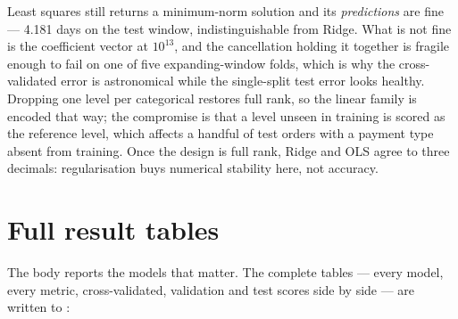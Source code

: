 Least squares still returns a minimum-norm solution and its \emph{predictions}
are fine --- 4.181 days on the test window, indistinguishable from Ridge. What is
not fine is the coefficient vector at $10^{13}$, and the cancellation holding it
together is fragile enough to fail on one of five expanding-window folds, which
is why the cross-validated error is astronomical while the single-split test
error looks healthy. Dropping one level per categorical restores full rank, so
the linear family is encoded that way; the compromise is that a level unseen in
training is scored as the reference level, which affects a handful of test
orders with a payment type absent from training. Once the design is full rank,
Ridge and OLS agree to three decimals: regularisation buys numerical stability
here, not accuracy.

\section{Full result tables}
\label{app:tables}

The body reports the models that matter. The complete tables --- every model,
every metric, cross-validated, validation and test scores side by side --- are
written to :

